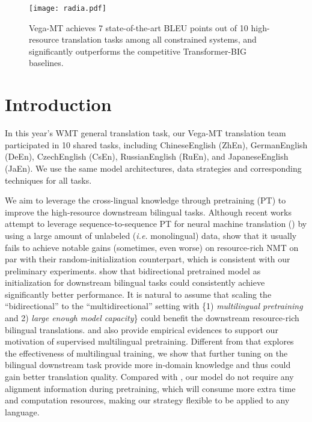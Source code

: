 \documentclass[11pt,a4paper]{article}
\newcommand{\zct}{\color{black}}
\begin{document}
\begin{figure}[htb]
    \centering
    \texttt{[image: radia.pdf]}
    \caption{Vega-MT achieves 7 state-of-the-art BLEU points out of 10 high-resource translation tasks among all constrained systems, and significantly outperforms the competitive Transformer-\textsc{BIG} baselines.}
    \label{fig:radia}
\end{figure}

\section{Introduction}
In this year's WMT general translation task, our Vega-MT translation team participated in 10 shared tasks, including ChineseEnglish (ZhEn), GermanEnglish (DeEn), CzechEnglish (CsEn), RussianEnglish (RuEn), and JapaneseEnglish (JaEn). We use the same model architectures, data strategies and corresponding techniques for all tasks.

We aim to leverage the cross-lingual knowledge through pretraining (PT) to improve the high-resource downstream bilingual tasks. Although recent works~\cite{song2019mass,bart2020,Liu:2020mbart,wang-etal-2022-understanding} attempt to leverage sequence-to-sequence PT for neural machine translation (\citealp[NMT;][]{bahdanau2014neural,DBLP:journals/corr/GehringAGYD17,DBLP:journals/corr/VaswaniSPUJGKP17}) by using a large amount of unlabeled (\textit{i.e.} monolingual) data, \citet{Zan2022PTvsRI} show that it usually fails to achieve notable gains (sometimes, even worse) on resource-rich NMT on par with their random-initialization counterpart, which is consistent with our preliminary experiments. \citet{ding2021improving} show that bidirectional pretrained model as initialization for downstream bilingual tasks could consistently achieve significantly better performance. It is natural to assume that scaling the ``bidirectional'' to the ``multidirectional'' setting with \{1) \textit{multilingual pretraining} and 2) \textit{large enough model capacity}\} could benefit the downstream resource-rich bilingual translations. \citet{facebook2021} and \citet{lin2020pre} also provide empirical evidences to support our motivation of supervised multilingual pretraining. Different from \citet{facebook2021} that explores the effectiveness of multilingual training, we show that further tuning on the bilingual downstream task provide more in-domain knowledge and thus could gain better translation quality. Compared with \citet{lin2020pre}, our model do not require any alignment information during pretraining, which will consume more extra time and computation resources, making our strategy {\zct flexible to be applied to any language}.
\end{document}
